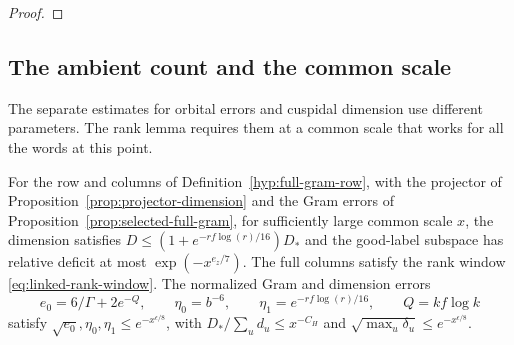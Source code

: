 \begin{proof}
\end{proof}

\subsection{The ambient count and the common scale}
\label{subsec:selected-ambient-count}

The separate estimates for orbital errors and cuspidal dimension use different parameters. The rank lemma requires them at a common scale that works for all the words at this point.

\begin{proposition}\label{prop:selected-rank-comparison}
For the row and columns of Definition~\ref{hyp:full-gram-row},
with the projector of Proposition~\ref{prop:projector-dimension}
and the Gram errors of Proposition~\ref{prop:selected-full-gram},
for sufficiently large common scale \(x\),
the dimension satisfies \(D\le (1+e^{-rf\log(r)/16})D_*\) and
the good-label subspace has relative deficit at most
\(\exp(-x^{e_z/7})\). The full columns satisfy the rank window
\eqref{eq:linked-rank-window}. The normalized Gram and dimension errors
\[
 e_0=6/\Gamma+2e^{-Q},\qquad \eta_0=b^{-6},\qquad
 \eta_1=e^{-rf\log(r)/16},\qquad Q=kf\log k
\]
satisfy
\(\sqrt{e_0},\eta_0,\eta_1\le e^{-x^{\epsilon/8}}\), with
\(D_*/\sum_u d_u\le x^{-C_H}\) and
\(\sqrt{\max_u\delta_u}\le e^{-x^{\epsilon/8}}\).
\end{proposition}


